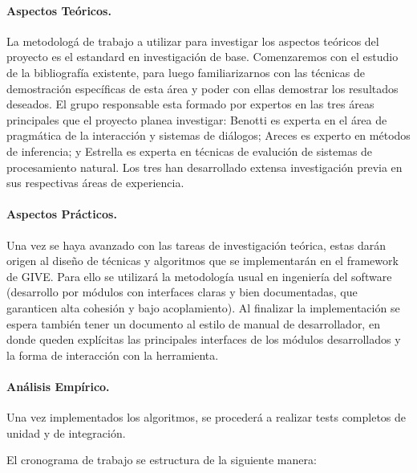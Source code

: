 \paragraph{Aspectos Te\'oricos.}
La metodolog\'a de trabajo a utilizar para investigar los aspectos
te\'oricos del proyecto es el estandard en investigaci\'on de base.
Comenzaremos con el estudio de la bibliograf\'ia existente, para luego
familiarizarnos con las t\'ecnicas de demostraci\'on espec\'ificas de esta
\'area y poder con ellas demostrar los resultados deseados. El grupo
responsable esta formado por expertos en las tres \'areas principales
que el proyecto planea investigar: Benotti es experta en el \'area de
pragm\'atica de la interacci\'on y sistemas de di\'alogos; Areces es
experto en m\'etodos de inferencia; y Estrella es experta en t\'ecnicas
de evaluci\'on de sistemas de procesamiento natural.
Los tres han desarrollado extensa investigaci\'on previa en sus respectivas \'areas
de experiencia.

\paragraph{Aspectos Pr\'acticos.}
Una vez se haya avanzado con las tareas de investigaci\'on te\'orica,
estas dar\'an origen al dise\~no de t\'ecnicas y algoritmos que se
implementar\'an en el framework de GIVE. Para ello se utilizar\'a la metodolog\'ia
usual en ingenier\'ia del software (desarrollo por
m\'odulos con interfaces claras y bien documentadas,
que garanticen alta cohesi\'on y bajo acoplamiento).
Al finalizar la implementaci\'on
se espera tambi\'en tener un documento al estilo de manual de
desarrollador, en donde queden expl\'icitas las principales interfaces
de los m\'odulos desarrollados y la forma de interacci\'on con la
herramienta.


\paragraph{An\'alisis Emp\'irico.}
Una vez
implementados los algoritmos, se proceder\'a a realizar tests
completos de unidad y de integraci\'on.



El cronograma de trabajo se estructura de la siguiente manera:

